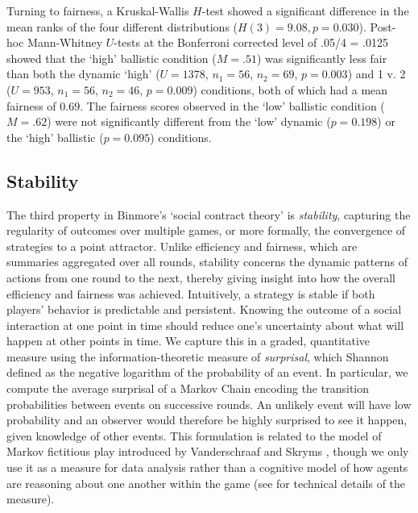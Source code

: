 \documentclass[10pt,letterpaper]{article}
\begin{document}
Turning to fairness, a Kruskal-Wallis $H$-test showed a significant difference in the mean ranks of the four different distributions ($H(3) = 9.08, p = 0.030$). Post-hoc Mann-Whitney $U$-tests at the Bonferroni corrected level of .05/4 = .0125 showed that the `high' ballistic condition ($M = .51$)  was significantly less fair than both the dynamic `high' ($U = 1378$, $n_1 = 56$, $n_2 = 69$, $p = 0.003$) and 1 v. 2 ($U =953$, $n_1 = 56$, $n_2 = 46$, $p = 0.009$) conditions, both of which had a mean fairness of $0.69$. The fairness scores observed in the `low' ballistic condition ($M = .62$) were not significantly different from the `low' dynamic ($p = 0.198$) or the `high' ballistic ($p = 0.095$) conditions. 



\subsection*{Stability}

The third property in Binmore's `social contract theory' is \emph{stability}, capturing the regularity of outcomes over multiple games, or more formally, the convergence of strategies to a point attractor. Unlike efficiency and fairness, which are summaries aggregated over all rounds, stability concerns the dynamic patterns of actions from one round to the next, thereby giving insight into how the overall efficiency and fairness was achieved. Intuitively, a strategy is stable if both players' behavior is predictable and persistent. Knowing the outcome of a social interaction at one point in time should reduce one's uncertainty about what will happen at other points in time. We capture this in a graded, quantitative measure using the information-theoretic measure of \emph{surprisal}, which Shannon \cite{Shannon48} defined as the negative logarithm of the probability of an event. In particular, we compute the average surprisal of a Markov Chain encoding the transition probabilities between events on successive rounds. An unlikely event will have low probability and an observer would therefore be highly surprised to see it happen, given knowledge of other events.  This formulation is related to the model of Markov fictitious play introduced by Vanderschraaf and Skryms \cite{VanderschraafSkyrms03_LearningToTakeTurns}, though we only use it as a measure for data analysis rather than a cognitive model of how agents are reasoning about one another within the game (see  for technical details of the measure). 
\end{document}

